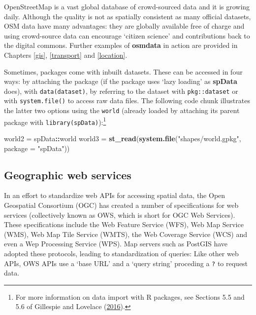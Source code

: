 \documentclass[]{krantz}
\newenvironment{Shaded}{\begin{snugshade}}{\end{snugshade}}
\newcommand{\DataTypeTok}[1]{\textcolor[rgb]{0.27,0.27,0.27}{#1}}
\newcommand{\KeywordTok}[1]{\textcolor[rgb]{0.27,0.27,0.27}{\textbf{#1}}}
\newcommand{\NormalTok}[1]{#1}
\newcommand{\OperatorTok}[1]{\textcolor[rgb]{0.43,0.43,0.43}{\textbf{#1}}}
\newcommand{\StringTok}[1]{\textcolor[rgb]{0.5,0.5,0.5}{#1}}
\let\rmarkdownfootnote\footnote%
\def\footnote{\protect\rmarkdownfootnote}
\begin{document}
OpenStreetMap is a vast global database of crowd-sourced data and it is growing daily.
Although the quality is not as spatially consistent as many official datasets, OSM data have many advantages: they are globally available free of charge and using crowd-source data can encourage `citizen science' and contributions back to the digital commons.
Further examples of \textbf{osmdata} in action are provided in Chapters \ref{gis}, \ref{transport} and \ref{location}.

Sometimes, packages come with inbuilt datasets.
These can be accessed in four ways: by attaching the package (if the package uses `lazy loading' as \textbf{spData} does), with \texttt{data(dataset)}, by referring to the dataset with \texttt{pkg::dataset} or with \texttt{system.file()} to access raw data files.
The following code chunk illustrates the latter two options using the \texttt{world} (already loaded by attaching its parent package with \texttt{library(spData)}):\footnote{For more information on data import with R packages, see Sections 5.5 and 5.6 of Gillespie and Lovelace (\protect\hyperlink{ref-gillespie_efficient_2016}{2016}).}

\begin{Shaded}
\begin{Highlighting}[]
\NormalTok{world2 =}\StringTok{ }\NormalTok{spData}\OperatorTok{::}\NormalTok{world}
\NormalTok{world3 =}\StringTok{ }\KeywordTok{st_read}\NormalTok{(}\KeywordTok{system.file}\NormalTok{(}\StringTok{"shapes/world.gpkg"}\NormalTok{, }\DataTypeTok{package =} \StringTok{"spData"}\NormalTok{))}
\end{Highlighting}
\end{Shaded}

\hypertarget{geographic-web-services}{%
\subsection{Geographic web services}\label{geographic-web-services}}

In an effort to standardize web APIs for accessing spatial data, the Open Geospatial Consortium (OGC) has created a number of specifications for web services (collectively known as OWS, which is short for OGC Web Services).
These specifications include the Web Feature Service (WFS), Web Map Service (WMS), Web Map Tile Service (WMTS), the Web Coverage Service (WCS) and even a Wep Processing Service (WPS).
Map servers such as PostGIS have adopted these protocols, leading to standardization of queries:
Like other web APIs, OWS APIs use a `base URL' and a `query string' proceding a \texttt{?} to request data.
\end{document}
